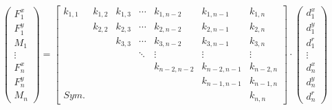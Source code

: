 \begin{equation} \label{system}
    \begin{pmatrix}
        F_{1}^x \\
        F_{1}^y \\
        M_{1} \\
        \vdots \\
        F_{n}^x \\
        F_{n}^y \\
        M_{n}
    \end{pmatrix} = \begin{bmatrix}
        k_{1,1}  & k_{1,2} & k_{1,3}  & \cdots & k_{1,n-2}   & k_{1,n-1}   & k_{1,n}   \\
                 & k_{2,2} & k_{2,3}  & \cdots & k_{2,n-2}   & k_{2,n-1}   & k_{2,n}   \\
                 &         & k_{3,3}  & \cdots & k_{3,n-2}   & k_{3,n-1}   & k_{3,n}   \\
                 &         &          & \ddots & \vdots      & \vdots      & \vdots    \\
                 &         &          &        & k_{n-2,n-2} & k_{n-2,n-1} & k_{n-2,n} \\
                 &         &          &        &             & k_{n-1,n-1} & k_{n-1,n} \\
        Sym.     &         &          &        &             &             & k_{n,n}   
    \end{bmatrix} \cdot \begin{pmatrix}
        d_{1}^x \\
        d_{1}^y \\
        d_{1}^r \\
        \vdots \\
        d_n^x \\
        d_n^y \\
        d_n^r
    \end{pmatrix}
\end{equation}


